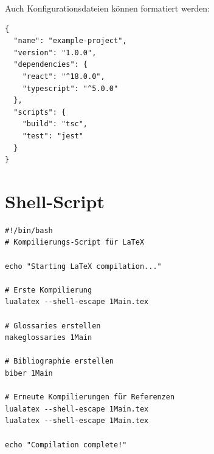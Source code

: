 Auch Konfigurationsdateien können formatiert werden:

\begin{listing}[htbp]
\begin{verbatim}
{
  "name": "example-project",
  "version": "1.0.0",
  "dependencies": {
    "react": "^18.0.0",
    "typescript": "^5.0.0"
  },
  "scripts": {
    "build": "tsc",
    "test": "jest"
  }
}
\end{verbatim}
\caption{package.json Beispiel}
\label{lst:json-beispiel}
\end{listing}

\section{Shell-Script}
\label{sec:bash-code}

\begin{listing}[htbp]
\begin{verbatim}
#!/bin/bash
# Kompilierungs-Script für LaTeX

echo "Starting LaTeX compilation..."

# Erste Kompilierung
lualatex --shell-escape 1Main.tex

# Glossaries erstellen
makeglossaries 1Main

# Bibliographie erstellen
biber 1Main

# Erneute Kompilierungen für Referenzen
lualatex --shell-escape 1Main.tex
lualatex --shell-escape 1Main.tex

echo "Compilation complete!"
\end{verbatim}
\caption{Bash-Script für LaTeX-Kompilierung}
\label{lst:bash-beispiel}
\end{listing}


